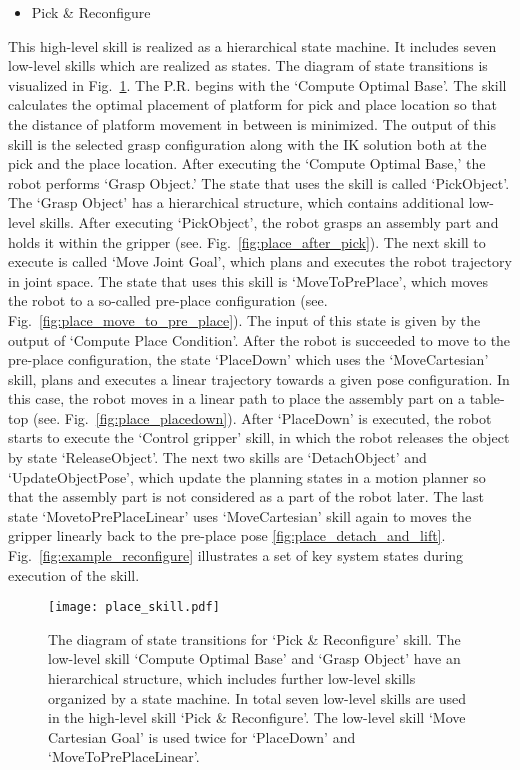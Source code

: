 \begin{itemize}
\item Pick \& Reconfigure 
\end{itemize}
This high-level skill is realized as a hierarchical state machine. It includes seven low-level skills which are realized as states. The diagram of state transitions is visualized in Fig.~\ref{fig:place_skill}. The P.R. begins with the `Compute Optimal Base'. The skill calculates the optimal placement of platform for pick and place location so that the distance of platform movement in between is minimized. The output of this skill is the selected grasp configuration along with the IK solution both at the pick and the place location. After executing the `Compute Optimal Base,' the robot performs `Grasp Object.' The state that uses the skill is called `PickObject'. The `Grasp Object' has a hierarchical structure, which contains additional low-level skills. After executing `PickObject', the robot grasps an assembly part and holds it within the gripper (see. Fig.~\ref{fig:place_after_pick}). The next skill to execute is called `Move Joint Goal', which plans and executes the robot trajectory in joint space. The state that uses this skill is `MoveToPrePlace', which moves the robot to a so-called pre-place configuration (see. Fig.~\ref{fig:place_move_to_pre_place}). The input of this state is given by the output of `Compute Place Condition'. After the robot is succeeded to move to the pre-place configuration, the state `PlaceDown' which uses the `MoveCartesian' skill, plans and executes a linear trajectory towards a given pose configuration. In this case, the robot moves in a linear path to place the assembly part on a table-top (see. Fig.~\ref{fig:place_placedown}). After `PlaceDown' is executed, the robot starts to execute the `Control gripper' skill, in which the robot releases the object by state `ReleaseObject'. The next two skills are `DetachObject' and `UpdateObjectPose', which update the planning states in a motion planner so that the assembly part is not considered as a part of the robot later. The last state `MovetoPrePlaceLinear' uses `MoveCartesian' skill again to moves the gripper linearly back to the pre-place pose \ref{fig:place_detach_and_lift}.  Fig.~\ref{fig:example_reconfigure} illustrates a set of key system states during execution of the skill.

\begin{figure}[!htbp]
\centering
\texttt{[image: place\_skill.pdf]}
\captionsetup{justification=raggedright}
\caption{The diagram of state transitions for `Pick \& Reconfigure' skill. The low-level skill `Compute Optimal Base' and `Grasp Object' have an hierarchical structure, which includes further low-level skills organized by a state machine. In total seven low-level skills are used in the high-level skill `Pick \& Reconfigure'. The low-level skill `Move Cartesian Goal' is used twice for `PlaceDown' and `MoveToPrePlaceLinear'.}
\label{fig:place_skill}
\end{figure}

